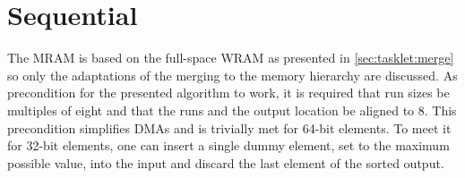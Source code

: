 \section{Sequential \texorpdfstring{\MS{}}{MergeSort}}
\label{sec:mram:merge}

The \ac{MRAM} \MS{} is based on the full-space \ac{WRAM} \MS{} as presented in \cref{sec:tasklet:merge} so only the adaptations of the merging to the memory hierarchy are discussed.
As precondition for the presented algorithm to work, it is required that run sizes be multiples of eight and that the runs and the output location be aligned to \qty{8}{\byte}.
This precondition simplifies \acp{DMA} and is trivially met for 64-bit elements.
To meet it for 32-bit elements, one can insert a single dummy element, set to the maximum possible value, into the input and discard the last element of the sorted output.







